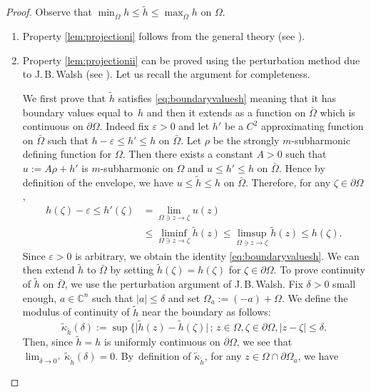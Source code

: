\documentclass[JEP,XML,SOM,Unicode]{cedram}
\newcommand{\sep}{\,;\,}
\theoremstyle{definition}
\renewcommand{\C}{\mathbb{C}}
\begin{document}
\begin{proof}
Observe that $\min_{\bar \Omega} h \leq \tilde h \leq \max_{\bar \Omega} h$ on $\Omega$.
\begin{enumerate}
\item
Property \eqref{lem:projectioni} follows from the general theory (see \cite{Lu12}).

\item
Property \eqref{lem:projectionii} can be proved using the perturbation method due to J.\,B.\,Walsh (see \cite{Wal69}). Let us recall the argument for completeness.

We first prove that $\tilde h$ satisfies \eqref{eq:boundaryvaluesh} meaning that it has boundary values equal to~$h$ and then it extends as a function on $\bar \Omega$ which is continuous on $\partial \Omega$. Indeed fix $\varepsilon > 0$ and let $h'$ be a $C^2$ approximating function on $\bar \Omega$ such that $h - \varepsilon \leq h' \leq h $ on $\bar \Omega$. Let $\rho$ be the strongly $m$-subharmonic defining function for $\Omega$. Then there exists a constant $A > 0$ such that $u:= A \rho + h'$ is $m$-subharmonic on $\Omega$ and $u \leq h' \leq h$ on $\bar \Omega$. Hence by definition of the envelope, we have $u \leq \tilde h \leq h$ on $\bar \Omega$. Therefore, for any $\zeta \in \partial \Omega$,
\begin{align*}
h (\zeta) - \varepsilon \leq h' (\zeta) & = \lim_{\Omega \ni z \to \zeta } u (z) \\
& \leq \liminf_{\Omega \ni z \to \zeta } \tilde h (z) \leq \limsup_{\Omega \ni z \to \zeta } \tilde h (z) \leq h (\zeta).
\end{align*}
Since $\varepsilon > 0$ is arbitrary, we obtain the identity \eqref{eq:boundaryvaluesh}.
We can then extend $\tilde h$ to $\bar \Omega$ by setting $\tilde h (\zeta) = h (\zeta)$ for $\zeta \in \partial \Omega$. To prove continuity of $\tilde h$ on $\bar \Omega$, we use the perturbation argument of J.\,B.\,Walsh. Fix $\delta > 0$ small enough, $a \in \C^n$ such that $\vert a \vert \leq \delta$ and set $\Omega_a:= (- a) + \Omega$. We define the modulus of continuity of $\tilde{h}$ near the boundary as follows:
\[
\tilde{\kappa}_{\tilde h} (\delta):= \sup \{ \vert \tilde h(z) - \tilde{h} (\zeta)\vert \sep z \in \Omega, \zeta \in \partial \Omega, \vert z - \zeta\vert \leq \delta.
\]
Then, since $\tilde h = h$ is uniformly continuous on $\partial \Omega$, we see that $\lim_{\delta \to 0^+} \tilde{\kappa}_{\tilde h} (\delta) = 0$. By~definition of $\tilde{\kappa}_{\tilde h}$, for any $z \in \Omega \cap \partial \Omega_a$, we have

\end{enumerate}
\end{proof}
\end{document}
